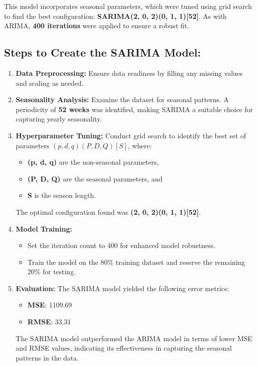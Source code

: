 This model incorporates seasonal parameters, which were tuned using grid search to find the best configuration: \textbf{SARIMA(2, 0, 2)(0, 1, 1)[52]}. As with ARIMA, \textbf{400 iterations} were applied to ensure a robust fit.

\subsection*{Steps to Create the SARIMA Model:}
\begin{enumerate}
	\item \textbf{Data Preprocessing:}  
	Ensure data readiness by filling any missing values and scaling as needed.
	
	\item \textbf{Seasonality Analysis:}  
	Examine the dataset for seasonal patterns. A periodicity of \textbf{52 weeks} was identified, making SARIMA a suitable choice for capturing yearly seasonality.
	
	\item \textbf{Hyperparameter Tuning:}  
	Conduct grid search to identify the best set of parameters $(p, d, q)(P, D, Q)[S]$, where:
	\begin{itemize}
		\item \textbf{(p, d, q)} are the non-seasonal parameters,
		\item \textbf{(P, D, Q)} are the seasonal parameters, and
		\item \textbf{S} is the season length.
	\end{itemize}
	The optimal configuration found was \textbf{(2, 0, 2)(0, 1, 1)[52]}.
	
	\item \textbf{Model Training:}
	\begin{itemize}
		\item Set the iteration count to 400 for enhanced model robustness.
		\item Train the model on the 80\% training dataset and reserve the remaining 20\% for testing.
	\end{itemize}
	
	\item \textbf{Evaluation:}  
	The SARIMA model yielded the following error metrics:
	\begin{itemize}
		\item \textbf{MSE}: 1109.69
		\item \textbf{RMSE}: 33.31
	\end{itemize}
	The SARIMA model outperformed the ARIMA model in terms of lower MSE and RMSE values, indicating its effectiveness in capturing the seasonal patterns in the data.
\end{enumerate}

